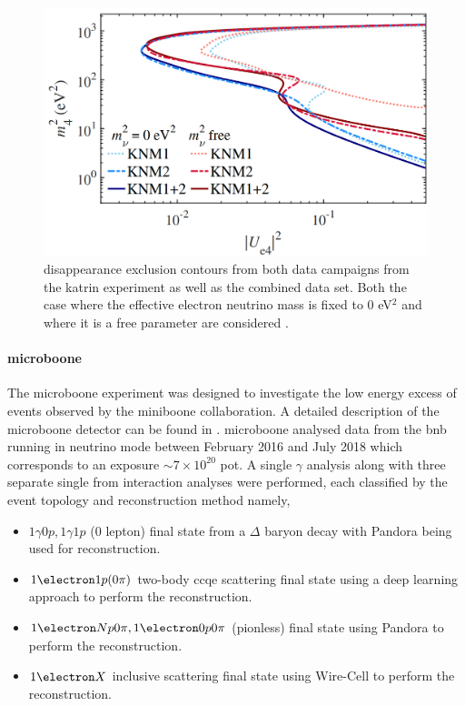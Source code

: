 \begin{figure}[h!]
    \centering
    \includegraphics[width = \largefigwidth]{figures-chap2/KATRIN_exclusion_contours.png}
    \caption[\nue disappearance exclusion contours from the \gls{katrin} experiment]{\nue disappearance exclusion contours from both data campaigns from the \gls{katrin} experiment as well as the combined data set. Both the case where the effective electron neutrino mass is fixed to 0 eV$^2$ and where it is a free parameter are considered \cite{KATRIN_sterile_neutrino_results}.}
    \label{fig:katrin_exclusion_contour}
\end{figure}

\newpage
\paragraph{\gls{microboone}}
The \gls{microboone} experiment was designed to investigate the low energy excess of events observed by the \gls{miniboone} collaboration. A detailed description of the \gls{microboone} detector can be found in . \gls{microboone} analysed data from the \gls{bnb} running in neutrino mode between February 2016 and July 2018 which corresponds to an exposure $\sim 7 \times 10^{20}$ \gls{pot}. A single $\gamma$ analysis along with three separate single \electron from \nue interaction analyses were performed, each classified by the event topology and reconstruction method namely, 
\begin{itemize}
    \item $1\gamma0p, 1\gamma1p$ (0 lepton) final state from a $\Delta$ baryon decay with Pandora being used for reconstruction. 
    \item $1\electron1p(0\pi)$ two-body \gls{ccqe} scattering final state using a deep learning approach to perform the reconstruction.
    \item $1\electron Np0\pi, 1\electron0p0\pi$ (pionless) final state using Pandora to perform the reconstruction. 
    \item $1\electron X$ inclusive scattering final state using Wire-Cell to perform the reconstruction.
\end{itemize}

